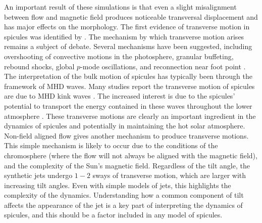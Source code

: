 \documentclass[12pt]{ociamthesis}
\newcommand{\np}{\\ \\}
\begin{document}
An important result of these simulations is that even a slight misalignment between flow and magnetic field produces noticeable transversal displacement and has major effects on the morphology. The first evidence of transverse motion in spicules was identified by \cite{Pasachoff1968SoPh5131P}. The mechanism by which transverse motion arises remains a subject of debate. Several mechanisms have been suggested, including overshooting of convective motions in the photosphere, granular buffeting, rebound shocks, global $p$-mode oscillations, and reconnection near foot point \citep{Roberts1979SoPh6123R, Sterling1988ApJ327950S, Vranjes2008A_A478553V, Jess2012ApJ744L5J, Ebadi2014Ap_SS353_31E}. The interpretation of the bulk motion of spicules has typically been through the framework of MHD waves. Many studies report the transverse motion of spicules are due to MHD kink waves \citep{Kukhianidze2006A_A449L35K, dePontieu2007Sci3181574D, Jess2012ApJ744L5J, Ebadi2014ApSS35331E, Tavabi2015AA573A4T, Jafarzadeh2017ApJS2299J}. The increased interest is due to the spicules' potential to transport the energy contained in these waves throughout the lower atmosphere \citep{dePontieu2007Sci3181574D, He2009ApJ705L217H, Morton2012NatCo31315M, Jess2012ApJ744L5J}.  These transverse motions are clearly an important ingredient in the dynamics of spicules and potentially in maintaining the hot solar atmosphere. Non-field aligned flow gives another mechanism to produce transverse motions. This simple mechanism is likely to occur due to the conditions of the chromosphere (where the flow will not always be aligned with the magnetic field), and the complexity of the Sun’s magnetic field. Regardless of the tilt angle, the synthetic jets undergo $1-2$ sways of transverse motion, which are larger with increasing tilt angles. Even with simple models of jets, this highlights the complexity of the dynamics. Understanding how a common component of tilt affects the appearance of the jet is a key part of interpreting the dynamics of spicules, and this should be a factor included in any model of spicules. \np
%



  
\end{document}
